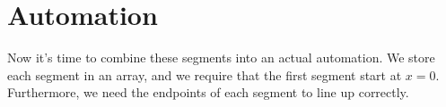 \documentclass{article}
\begin{document}
{%























\section{Automation}

Now it's time to combine these segments into an actual automation. We store each segment in an array, and we require that the first segment start at $x=0$. Furthermore, we need the endpoints of each segment to line up correctly.

}
\end{document}
